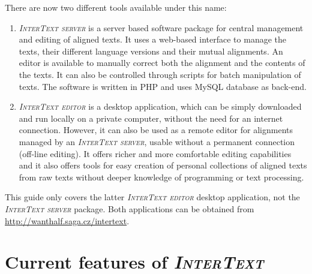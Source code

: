 \documentclass[a4paper,10pt,oneside]{book}
\newcommand{\IT}{\textit{\textsc{InterText}}\xspace}
\newcommand{\ITeditor}{\textit{\textsc{InterText editor}}\xspace}
\newcommand{\ITserver}{\textit{\textsc{InterText server}}\xspace}
\begin{document}
There are now two different tools available under this name:
\begin{enumerate}
	\item \ITserver is a server based software package for central management and editing of aligned texts. It uses a web-based interface to manage the texts, their different language versions and their mutual alignments. An editor is available to manually correct both the alignment and the contents of the texts. It can also be controlled through scripts for batch manipulation of texts. The software is written in PHP and uses MySQL database as back-end.
	\item \ITeditor is a desktop application, which can be simply downloaded and run locally on a private computer, without the need for an internet connection. However, it can also be used as a remote editor for alignments managed by an \ITserver, usable without a permanent connection (off-line editing). It offers richer and more comfortable editing capabilities and it also offers tools for easy creation of personal collections of aligned texts from raw texts without deeper knowledge of programming or text processing.
\end{enumerate}

This guide only covers the latter \ITeditor desktop application, not the \ITserver package. Both applications can be obtained from \url{http://wanthalf.saga.cz/intertext}.

\chapter{Current features of \IT}\label{ch:intro:features}
\end{document}
